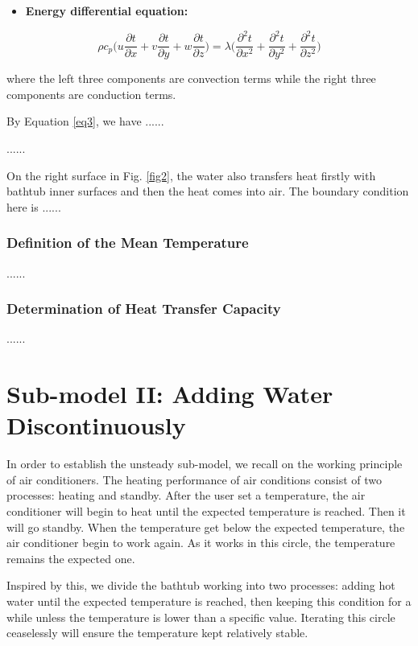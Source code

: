 \documentclass{mcmthesis}
\begin{document}
\begin{itemize}[leftmargin=*]
\item {\bf Energy differential equation:}
\end{itemize}

\begin{equation} \label{eq3}
\rho c_p \Big( u\frac{\partial t}{\partial x} + v\frac{\partial t}{\partial y} + w\frac{\partial t}{\partial z} \Big) = \lambda \Big(\frac{\partial^2 t}{\partial x^2} + \frac{\partial^2 t}{\partial y^2} + \frac{\partial^2 t}{\partial z^2} \Big)
\end{equation}

\noindent where the left three components are convection terms while the right three components are conduction terms.

By Equation \eqref{eq3}, we have ......

......

On the right surface in Fig. \ref{fig2}, the water also transfers heat firstly with bathtub inner surfaces and then the heat comes into air. The boundary condition here is ......

\subsubsection{Definition of the Mean Temperature}

......

\subsubsection{Determination of Heat Transfer Capacity}

......

\section{Sub-model II: Adding Water Discontinuously}

In order to establish the unsteady sub-model, we recall on the working principle of air conditioners. The heating performance of air conditions consist of two processes: heating and standby. After the user set a temperature, the air conditioner will begin to heat until the expected temperature is reached. Then it will go standby. When the temperature get below the expected temperature, the air conditioner begin to work again. As it works in this circle, the temperature remains the expected one.

Inspired by this, we divide the bathtub working into two processes: adding
hot water until the expected temperature is reached, then keeping this
condition for a while unless the temperature is lower than a specific value. Iterating this circle ceaselessly will ensure the temperature kept relatively stable.
\end{document}
